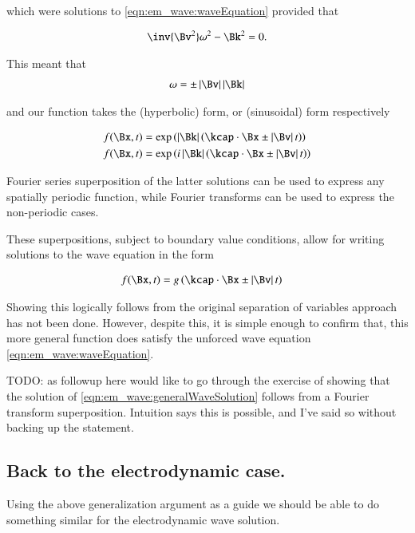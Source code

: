 which were solutions to \ref{eqn:em_wave:waveEquation} provided that

\begin{align*}
\inv{\Bv^2} \omega^2 - \Bk^2 = 0.
\end{align*}

This meant that 
\begin{align*}
\omega = \pm \Abs{\Bv} \Abs{\Bk}
\end{align*}

and our function takes the (hyperbolic) form, or (sinusoidal) form respectively

\begin{align*}
f(\Bx,t) &= \exp\left( \Abs{\Bk}\left( \kcap \cdot \Bx \pm \Abs{\Bv} t \right) \right) \\
f(\Bx,t) &= \exp\left( i \Abs{\Bk}\left( \kcap \cdot \Bx \pm \Abs{\Bv} t \right) \right)
\end{align*}

Fourier series superposition of the latter solutions can be used to express any spatially periodic function, while Fourier transforms 
can be used to express the non-periodic cases.

These superpositions, subject to boundary value conditions, allow for writing solutions to the wave equation in the form

\begin{align}\label{eqn:em_wave:generalWaveSolution}
f(\Bx,t) &= g\left( \kcap \cdot \Bx \pm \Abs{\Bv} t \right)
\end{align}

Showing this logically follows from the original separation of variables approach has not been done.   However, despite this,
it is
simple enough to confirm that,
this more general function does satisfy the unforced wave equation \ref{eqn:em_wave:waveEquation}.

TODO: as followup here would like to go through the exercise of showing 
that the solution of \ref{eqn:em_wave:generalWaveSolution} follows from a Fourier transform superposition.  Intuition says this is
possible, and I've said so without backing up the statement.

\subsection{Back to the electrodynamic case. }

Using the above generalization argument as a guide we should be able to do something similar for the electrodynamic wave solution.

